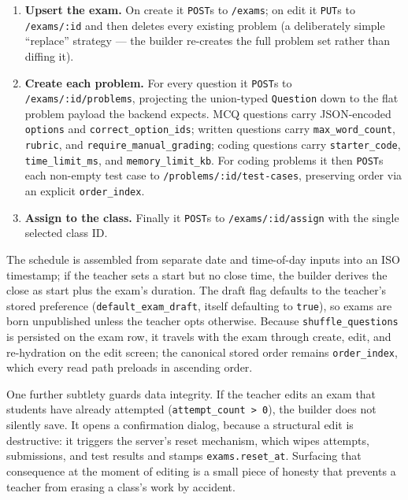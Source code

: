 \begin{enumerate}
  \item \textbf{Upsert the exam.} On create it \texttt{POST}s to \texttt{/exams};
    on edit it \texttt{PUT}s to \texttt{/exams/:id} and then deletes every
    existing problem (a deliberately simple ``replace'' strategy --- the builder
    re-creates the full problem set rather than diffing it).
  \item \textbf{Create each problem.} For every question it \texttt{POST}s to
    \texttt{/exams/:id/problems}, projecting the union-typed \texttt{Question}
    down to the flat problem payload the backend expects. MCQ questions carry
    JSON-encoded \texttt{options} and \texttt{correct\_option\_ids}; written
    questions carry \texttt{max\_word\_count}, \texttt{rubric}, and
    \texttt{require\_manual\_grading}; coding questions carry
    \texttt{starter\_code}, \texttt{time\_limit\_ms}, and
    \texttt{memory\_limit\_kb}. For coding problems it then \texttt{POST}s each
    non-empty test case to \texttt{/problems/:id/test-cases}, preserving order
    via an explicit \texttt{order\_index}.
  \item \textbf{Assign to the class.} Finally it \texttt{POST}s to
    \texttt{/exams/:id/assign} with the single selected class ID.
\end{enumerate}

The schedule is assembled from separate date and time-of-day inputs into an ISO
timestamp; if the teacher sets a start but no close time, the builder derives the
close as start plus the exam's duration. The draft flag defaults to the
teacher's stored preference (\texttt{default\_exam\_draft}, itself defaulting to
\texttt{true}), so exams are born unpublished unless the teacher opts otherwise.
Because \texttt{shuffle\_questions} is persisted on the exam row, it travels
with the exam through create, edit, and re-hydration on the edit screen; the
canonical stored order remains \texttt{order\_index}, which every read path
preloads in ascending order.

One further subtlety guards data integrity. If the teacher edits an exam that
students have already attempted (\texttt{attempt\_count > 0}), the builder does
not silently save. It opens a confirmation dialog, because a structural edit is
destructive: it triggers the server's reset mechanism, which wipes attempts,
submissions, and test results and stamps \texttt{exams.reset\_at}. Surfacing
that consequence at the moment of editing is a small piece of honesty that
prevents a teacher from erasing a class's work by accident.


